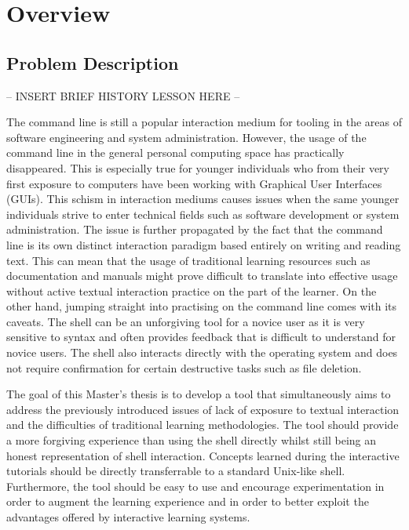 \chapter{Overview}
\label{chap:overview}
\section{Problem Description}

-- INSERT BRIEF HISTORY LESSON HERE --

The command line is still a popular interaction medium for tooling in the areas
of software engineering and system administration. However, the usage of the
command line in the general personal computing space has practically
disappeared. This is especially true for younger individuals who from their
very first exposure to computers have been working with Graphical User
Interfaces (GUIs). This schism in interaction mediums causes issues when the
same younger individuals strive to enter technical fields such as software
development or system administration. The issue is further propagated by the
fact that the command line is its own distinct interaction paradigm
based entirely on writing and reading text. This can mean that the usage of
traditional learning resources such as documentation and manuals might prove
difficult to translate into effective usage without active textual interaction
practice on the part of the learner. On the other hand, jumping straight into
practising on the command line comes with its caveats. The shell can be an
unforgiving tool for a novice user as it is very sensitive to syntax and often
provides feedback that is difficult to understand for novice users. The shell
also interacts directly with the operating system and does not require
confirmation for certain destructive tasks such as file deletion.

The goal of this Master's thesis is to develop a tool that simultaneously aims
to address the previously introduced issues of lack of exposure to textual
interaction and the difficulties of traditional learning methodologies. The
tool should provide a more forgiving experience than using the shell directly
whilst still being an honest representation of shell interaction. Concepts
learned during the interactive tutorials should be directly transferrable to a
standard Unix-like shell. Furthermore, the tool should be easy to use and
encourage experimentation in order to augment the learning experience and in
order to better exploit the advantages offered by interactive learning systems.


